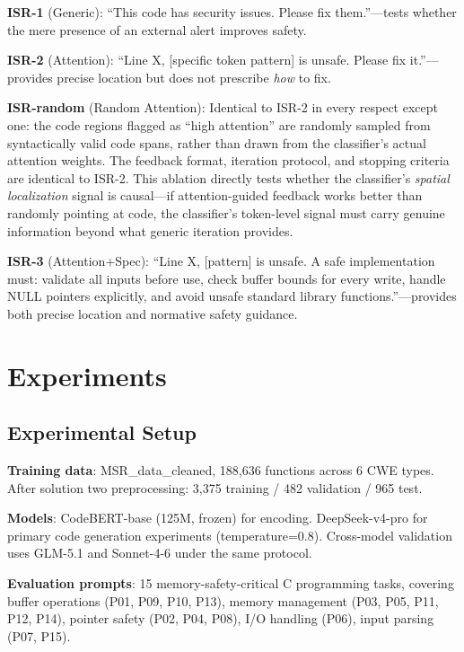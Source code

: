 \documentclass[10pt,conference]{IEEEtran}
\begin{document}
\textbf{ISR-1} (Generic): ``This code has security issues. Please fix them.''---tests whether the mere presence of an external alert improves safety.

\textbf{ISR-2} (Attention): ``Line X, [specific token pattern] is unsafe. Please fix it.''---provides precise location but does not prescribe \textit{how} to fix.

\textbf{ISR-random} (Random Attention): Identical to ISR-2 in every respect except one: the code regions flagged as ``high attention'' are randomly sampled from syntactically valid code spans, rather than drawn from the classifier's actual attention weights. The feedback format, iteration protocol, and stopping criteria are identical to ISR-2. This ablation directly tests whether the classifier's \textit{spatial localization} signal is causal---if attention-guided feedback works better than randomly pointing at code, the classifier's token-level signal must carry genuine information beyond what generic iteration provides.

\textbf{ISR-3} (Attention+Spec): ``Line X, [pattern] is unsafe. A safe implementation must: validate all inputs before use, check buffer bounds for every write, handle NULL pointers explicitly, and avoid unsafe standard library functions.''---provides both precise location and normative safety guidance.

\section{Experiments}

\subsection{Experimental Setup}

\textbf{Training data}: MSR\_data\_cleaned, 188,636 functions across 6 CWE types. After solution two preprocessing: 3,375 training / 482 validation / 965 test.

\textbf{Models}: CodeBERT-base (125M, frozen) for encoding. DeepSeek-v4-pro for primary code generation experiments (temperature=0.8). Cross-model validation uses GLM-5.1 and Sonnet-4-6 under the same protocol.

\textbf{Evaluation prompts}: 15 memory-safety-critical C programming tasks, covering buffer operations (P01, P09, P10, P13), memory management (P03, P05, P11, P12, P14), pointer safety (P02, P04, P08), I/O handling (P06), input parsing (P07, P15).
\end{document}
